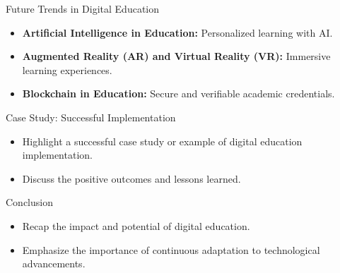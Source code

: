 \documentclass{beamer}
\begin{document}
\begin{frame}{Future Trends in Digital Education}
  \begin{itemize}
    \item \textbf{Artificial Intelligence in Education:} Personalized learning with AI.
    \item \textbf{Augmented Reality (AR) and Virtual Reality (VR):} Immersive learning experiences.
    \item \textbf{Blockchain in Education:} Secure and verifiable academic credentials.
  \end{itemize}
\end{frame}

\begin{frame}{Case Study: Successful Implementation}
  \begin{itemize}
    \item Highlight a successful case study or example of digital education implementation.
    \item Discuss the positive outcomes and lessons learned.
  \end{itemize}
\end{frame}

\begin{frame}{Conclusion}
  \begin{itemize}
    \item Recap the impact and potential of digital education.
    \item Emphasize the importance of continuous adaptation to technological advancements.
  \end{itemize}
\end{frame}
\end{document}
